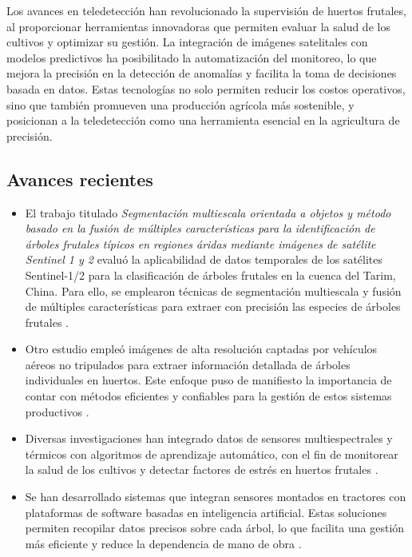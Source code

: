 Los avances en teledetección han revolucionado la supervisión de huertos frutales, 
al proporcionar herramientas innovadoras que permiten evaluar la salud de los cultivos
y optimizar su gestión. La integración de imágenes satelitales con modelos predictivos
ha posibilitado la automatización del monitoreo, lo que mejora la precisión en la 
detección de anomalías y facilita la toma de decisiones basada en datos. Estas
tecnologías no solo permiten reducir los costos operativos, sino que también 
promueven una producción agrícola más sostenible, y posicionan a la teledetección 
como una herramienta esencial en la agricultura de precisión.

\subsection{Avances recientes}

\begin{itemize}
  \item El trabajo titulado \textit{Segmentación multiescala orientada a objetos y método basado en la 
  fusión de múltiples características para la identificación de árboles frutales típicos en 
  regiones áridas mediante imágenes de satélite Sentinel 1 y 2} evaluó la aplicabilidad de datos temporales
  de los satélites Sentinel-1/2 para la clasificación de árboles frutales en la
  cuenca del Tarim, China. Para ello, se emplearon técnicas de segmentación multiescala y fusión de
  múltiples características para extraer con precisión las especies de árboles
  frutales \citep{Liang2024}.
  \item Otro estudio empleó imágenes de alta resolución captadas por vehículos aéreos no tripulados 
  para extraer información detallada de árboles individuales en huertos. Este enfoque puso de manifiesto 
  la importancia de contar con métodos eficientes y confiables para la gestión de estos sistemas productivos \citep{Dong2020}.
  \item Diversas investigaciones han integrado datos de sensores multiespectrales y 
  térmicos con algoritmos de aprendizaje automático, con el fin de monitorear la salud 
  de los cultivos y detectar factores de estrés en huertos frutales \citep{Kumar}.
  \item Se han desarrollado sistemas que integran sensores montados en tractores con 
  plataformas de software basadas en inteligencia artificial. Estas soluciones permiten recopilar datos 
  precisos sobre cada árbol, lo que facilita una gestión más eficiente y reduce la 
  dependencia de mano de obra \cite{OrchardRobotics2024}.
\end{itemize}

